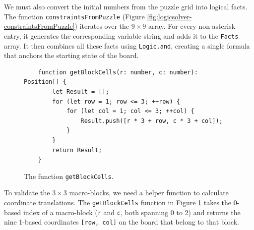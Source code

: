 We must also convert the initial numbers from the puzzle grid into logical facts.
The function \texttt{constraintsFromPuzzle}  (Figure \ref{fig:logicsolver-constraintsFromPuzzle}) iterates over
the $9 \times 9$ array. For every non-asterisk entry, it generates the corresponding variable string and adds
it to the \texttt{Facts} array. It then combines all these facts using \texttt{Logic.and}, creating a single
formula that anchors the starting state of the board. 


\begin{figure}[!ht]
  \centering
\begin{verbatim}
    function getBlockCells(r: number, c: number): Position[] {
        let Result = [];
        for (let row = 1; row <= 3; ++row) {
            for (let col = 1; col <= 3; ++col) {
                Result.push([r * 3 + row, c * 3 + col]);
            }
        }
        return Result;
    }
\end{verbatim}
\vspace*{-0.3cm}
  \caption{The function \texttt{getBlockCells}.}
  \label{fig:logicsolver-getBlockCells}
\end{figure}

To validate the $3 \times 3$ macro-blocks, we need a helper function to calculate coordinate translations.
The \texttt{getBlockCells} function in Figure \ref{fig:logicsolver-getBlockCells} takes the 0-based index of a
macro-block (\texttt{r} and \texttt{c}, both spanning 0 to 2) and returns the nine 1-based coordinates
\texttt{[row, col]} on the board that belong to that block. 


